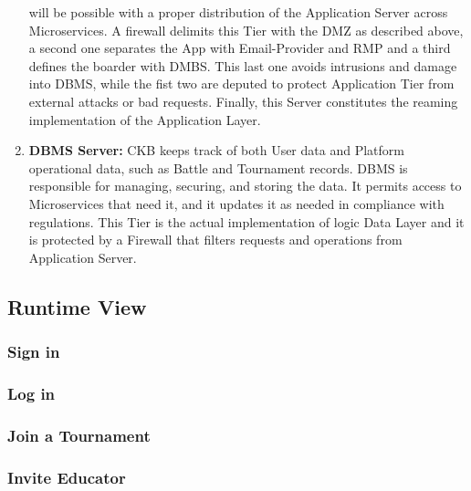 \begin{enumerate}[label=$\bullet$]
    will be possible with a proper distribution of the Application Server across Microservices. A firewall delimits this Tier with the DMZ as described above, a second one separates the App with Email-Provider and RMP and a third defines the boarder with DMBS.
    This last one avoids intrusions and damage into DBMS, while the fist two are deputed to protect Application Tier from external attacks or bad requests. Finally, this Server constitutes the reaming implementation of the Application Layer.
    \item \textbf{DBMS Server:} CKB keeps track of both User data and Platform operational data, such as Battle and Tournament records. DBMS is responsible for managing, securing, and storing the data. It permits access to 
    Microservices that need it, and it updates it as needed in compliance with regulations. This Tier is the actual implementation of logic Data Layer and it is protected by a Firewall that filters requests and operations from Application Server. 
\end{enumerate}

\subsection{Runtime View}
\subsubsection{Sign in}

\newpage
\subsubsection{Log in}

\newpage
\subsubsection{Join a Tournament}

\newpage
\subsubsection{Invite Educator}

